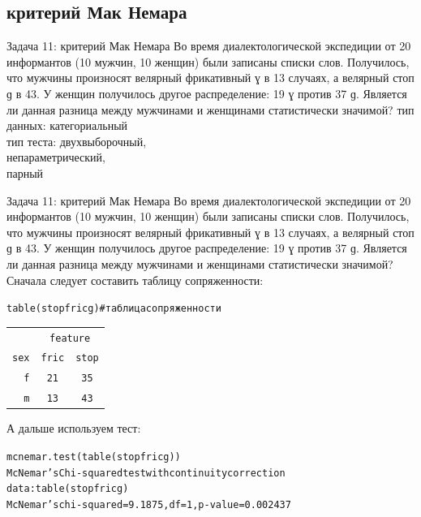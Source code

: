 \subsection{критерий Мак Немара}
\begin{frame}{Задача 11: критерий Мак Немара}
Во время диалектологической экспедиции от 20 информантов (10 мужчин, 10 женщин) были записаны списки слов. Получилось, что мужчины произносят велярный фрикативный ɣ в 13 случаях, а велярный стоп ɡ в 43. У женщин получилось другое распределение: 19 ɣ против 37 ɡ. Является ли данная разница между мужчинами и женщинами статистически значимой?
\vfill
тип данных: категориальный\\
тип теста: двухвыборочный,\\
непараметрический,\\
парный
\end{frame}
\begin{frame}{Задача 11: критерий Мак Немара}
Во время диалектологической экспедиции от 20 информантов (10 мужчин, 10 женщин) были записаны списки слов. Получилось, что мужчины произносят велярный фрикативный ɣ в 13 случаях, а велярный стоп ɡ в 43. У женщин получилось другое распределение: 19 ɣ против 37 ɡ. Является ли данная разница между мужчинами и женщинами статистически значимой?
\vfill
Сначала следует составить таблицу сопряженности:
\scriptsize
\begin{alltt}
\alert{table(stopfricg)}\hfill \# таблица сопряженности\medskip\\
\begin{tabular}{rcc}
 & \multicolumn{ 2}{c}{feature} \\ 
sex & fric & stop \\ 
f & 21 & 35 \\ 
m & 13 & 43 \\ 
\end{tabular}
\end{alltt}
\normalsize
А дальше используем тест:
\scriptsize
\begin{alltt}
\alert{mcnemar.test(table(stopfricg))}\medskip\\
McNemar's Chi-squared test with continuity correction\\
data:  table(stopfricg)\\
McNemar's chi-squared = 9.1875, df = 1, p-value = 0.002437\\
\end{alltt}
\normalsize
\end{frame}
